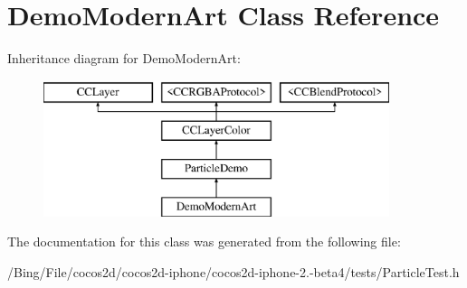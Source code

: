 \hypertarget{interface_demo_modern_art}{\section{Demo\-Modern\-Art Class Reference}
\label{interface_demo_modern_art}
}
Inheritance diagram for Demo\-Modern\-Art\-:\begin{figure}[H]
\begin{center}
\leavevmode
\includegraphics[height=4.000000cm]{interface_demo_modern_art}
\end{center}
\end{figure}


The documentation for this class was generated from the following file\-:\begin{DoxyCompactItemize}
\item 
/\-Bing/\-File/cocos2d/cocos2d-\/iphone/cocos2d-\/iphone-\/2.-\/beta4/tests/Particle\-Test.\-h\end{DoxyCompactItemize}
